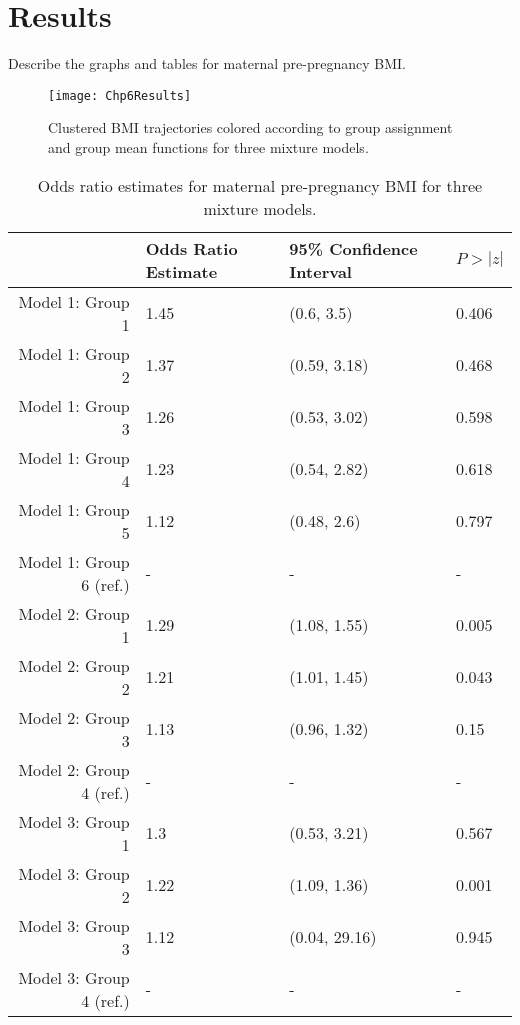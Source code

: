 \documentclass[11pt]{article}
\begin{document}
\section{Results}
Describe the graphs and tables for maternal pre-pregnancy BMI. 
\begin{figure}[h]
\begin{center}
\texttt{[image: Chp6Results]}
\end{center}
\label{fig:dataresults}
\caption{Clustered BMI trajectories colored according to group assignment and group mean functions for three mixture models.}
\end{figure}
\begin{table}[ht]
\begin{center}
\begin{tabular}{rlll}
  \hline
 & Odds Ratio Estimate & 95\% Confidence Interval & $P>|z|$ \\ 
  \hline
Model 1: Group  1 & 1.45 & (0.6, 3.5) & 0.406 \\ 
  Model 1: Group  2 & 1.37 & (0.59, 3.18) & 0.468 \\ 
  Model 1: Group  3 & 1.26 & (0.53, 3.02) & 0.598 \\ 
  Model 1: Group  4 & 1.23 & (0.54, 2.82) & 0.618 \\ 
  Model 1: Group  5 & 1.12 & (0.48, 2.6) & 0.797 \\ 
  Model 1: Group  6  (ref.) & - & - & - \\ 
  Model 2: Group  1 & 1.29 & (1.08, 1.55) & 0.005 \\ 
  Model 2: Group  2 & 1.21 & (1.01, 1.45) & 0.043 \\ 
  Model 2: Group  3 & 1.13 & (0.96, 1.32) & 0.15 \\ 
  Model 2: Group  4  (ref.) & - & - & - \\ 
  Model 3: Group  1 & 1.3 & (0.53, 3.21) & 0.567 \\ 
  Model 3: Group  2 & 1.22 & (1.09, 1.36) & 0.001 \\ 
  Model 3: Group  3 & 1.12 & (0.04, 29.16) & 0.945 \\ 
  Model 3: Group  4  (ref.) & - & - & - \\ 
   \hline
\end{tabular}
\caption{Odds ratio estimates for maternal pre-pregnancy BMI for three mixture models. }
\end{center}
\end{table}
\end{document}

